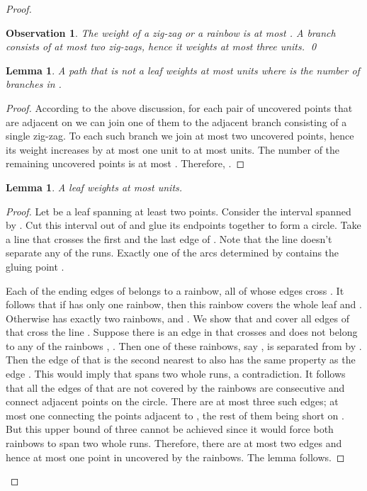 \documentclass[12pt]{article}
\newtheorem{lemma}[theorem]{Lemma}
\newtheorem{obs}[theorem]{Observation}
\begin{document}
\begin{proof}
\begin{obs}\label{o:mbranch}
The weight of a zig-zag or a rainbow is at most . A branch consists of at most two zig-zags, hence it weights at most three units. \qed
\end{obs}

 
\begin{lemma} \label{l:path}
A path  that is not a leaf weights at most  units where  is the number of branches in .
\end{lemma}

\begin{proof}
According to the above discussion, for each pair of uncovered points that are adjacent on  we can join one of them to the adjacent branch consisting of a single zig-zag. To each such branch we join at most two uncovered points, hence its weight increases by at most one unit to at most  units. The number of the remaining uncovered points is at most . Therefore, .
\end{proof}


\begin{lemma}\label{l:leaf}
A leaf weights at most  units.
\end{lemma}



\begin{proof}
Let  be a leaf spanning at least two points. Consider the interval spanned by . Cut this interval out of  and glue its endpoints together to form a circle. Take a line  that crosses the first and the last edge of . Note that the line  doesn't separate any of the runs. Exactly one of the arcs determined by  contains the gluing point . 

Each of the ending edges of  belongs to a rainbow, all of whose edges cross . It follows that if  has only one rainbow, then this rainbow covers the whole leaf  and .
Otherwise  has exactly two rainbows,  and . We show that  and  cover all edges of  that cross the line . Suppose there is an edge  in  that crosses  and does not belong to any of the rainbows , . Then one of these rainbows, say , is separated from  by . Then the edge of  that is the second nearest to  also has the same property as the edge . This would imply that  spans two whole runs, a contradiction. It follows that all the edges of  that are not covered by the rainbows are consecutive and connect adjacent points on the circle. There are at most three such edges; at most one connecting the points adjacent to , the rest of them being short on . But this upper bound of three cannot be achieved since it would force both rainbows to span two whole runs. Therefore, there are at most two edges and hence at most one point in  uncovered by the rainbows. The lemma follows.
\end{proof}



\end{proof}
\end{document}

